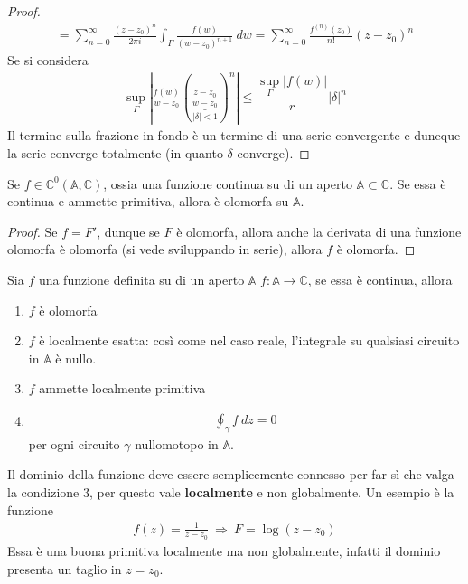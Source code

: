 \documentclass[a4paper, oneside]{article}
\begin{document}
\begin{proof}
    \begin{gather*}
        = \sum_{n = 0}^{\infty } \frac{(z - z_0)^{n}}{2\pi i} \int_{\Gamma} \frac{f(w)}{(w - z_0)^{n + 1}} \ dw  = \sum_{n = 0}^{\infty } \frac{f^{(n)}(z_0)}{n!}(z - z_0)^{n} 
    \end{gather*}
    Se si considera
    \begin{gather*}
        \sup_{\Gamma} \left| \frac{f(w)}{w - z_0} \left(\underset{\left| \delta \right|  < 1}{\underline{\frac{z - z_0}{w - z_0}}}\right)^{n} \right|  \leq \dfrac{\sup_{\Gamma} \left| f(w) \right| }{r}\left| \delta \right| ^n
    \end{gather*}
    Il termine sulla frazione in fondo  è un termine di una serie convergente e duneque la serie 
    converge totalmente (in quanto $\delta$ converge).
\end{proof}

\begin{theorem}
    Se $f \in \mathbb{C}^{0}(\mathbb{A}, \mathbb{C})$, ossia una funzione continua su 
    di un aperto $\mathbb{A} \subset \mathbb{C}$. Se essa è continua e ammette primitiva, 
    allora è olomorfa su $\mathbb{A}$.
\end{theorem}
\begin{proof}
    Se $f = F'$, dunque se $F$ è olomorfa, allora anche la derivata di 
    una funzione olomorfa è olomorfa (si vede sviluppando in serie), 
    allora $f$ è olomorfa.
\end{proof}

\begin{theorem}
    Sia $f$ una funzione definita su di un aperto $\mathbb{A}$ 
    $f : \mathbb{A} \to \mathbb{C}$, se essa è continua, allora 
    \begin{enumerate}
        \item $f$ è olomorfa
        \item $f$ è localmente esatta: così come nel caso reale,
        l'integrale su qualsiasi circuito in $\mathbb{A}$ è nullo.
        \item $f$ ammette localmente primitiva
        \item 
        \begin{align}
            \oint_\gamma f \ dz = 0
        \end{align}
        per ogni circuito $\gamma$ nullomotopo in $\mathbb{A}$.
    \end{enumerate}
\end{theorem}
\begin{corollary}
    Il dominio della funzione deve essere semplicemente connesso per far sì che valga 
    la condizione 3, per questo vale \textbf{localmente} e non globalmente. Un esempio 
    è la funzione
    \begin{gather*}
        f(z) = \frac{1}{z - z_0} \ \Longrightarrow \ F = \log(z - z_0)
    \end{gather*}
    Essa è una buona primitiva localmente ma non globalmente, infatti il dominio presenta un taglio
    in $z = z_0$. 
\end{corollary}
\end{document}
